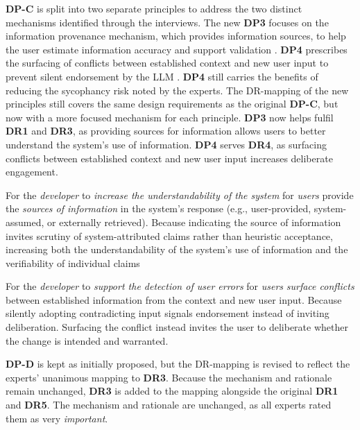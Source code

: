 \textbf{DP-C} is split into two separate principles to address the two distinct mechanisms identified through the interviews. The new \textbf{DP3} focuses on the information provenance mechanism, which provides information sources, to help the user estimate information accuracy and support validation \parencite[cf.][]{Steyvers2025}. \textbf{DP4} prescribes the surfacing of conflicts between established context and new user input to prevent silent endorsement by the \ac{LLM} \parencite{Clark1989}. \textbf{DP4} still carries the benefits of reducing the sycophancy risk noted by the experts. The \ac{DR}-mapping of the new principles still covers the same design requirements as the original \textbf{DP-C}, but now with a more focused mechanism for each principle. \textbf{DP3} now helps fulfil \textbf{DR1} and \textbf{DR3}, as providing sources for information allows users to better understand the system's use of information. \textbf{DP4} serves \textbf{DR4}, as surfacing conflicts between established context and new user input increases deliberate engagement.

    {For the \textit{developer} to \textit{increase the understandability of the system} for \textit{users}}
    {provide the \textit{sources of information} in the system's response (e.g., user-provided, system-assumed, or externally retrieved).}
    {Because indicating the source of information invites scrutiny of system-attributed claims rather than heuristic acceptance, increasing both the understandability of the system's use of information and the verifiability of individual claims}

    {For the \textit{developer} to \textit{support the detection of user errors} for \textit{users}}
    {\textit{surface conflicts} between established information from the context and new user input.}
    {Because silently adopting contradicting input signals endorsement instead of inviting deliberation. Surfacing the conflict instead invites the user to deliberate whether the change is intended and warranted.}

\textbf{DP-D} is kept as initially proposed, but the \ac{DR}-mapping is revised to reflect the experts' unanimous mapping to \textbf{DR3}. Because the mechanism and rationale remain unchanged, \textbf{DR3} is added to the mapping alongside the original \textbf{DR1} and \textbf{DR5}. The mechanism and rationale are unchanged, as all experts rated them as very \textit{important}.

